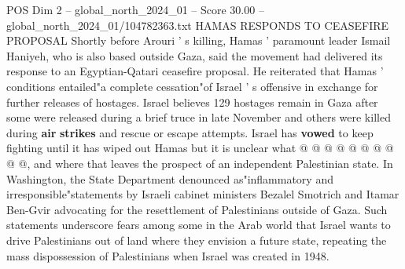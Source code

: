 \begin{textsample}{POS Dim 2 – global\_north\_2024\_01 – Score 30.00 – global\_north\_2024\_01/104782363.txt}
HAMAS RESPONDS TO CEASEFIRE PROPOSAL Shortly before Arouri ' s killing, Hamas ' paramount leader Ismail Haniyeh, who is also based outside Gaza, said the movement had delivered its response to an Egyptian-Qatari ceasefire proposal.
He reiterated that Hamas ' conditions entailed"a complete cessation"of Israel ' s offensive in exchange for further releases of hostages.
Israel believes 129 hostages remain in Gaza after some were released during a brief truce in late November and others were killed during \textbf{air} \textbf{strikes} and rescue or escape attempts.
Israel has \textbf{vowed} to keep fighting until it has wiped out Hamas but it is unclear what @ @ @ @ @ @ @ @ @ @, and where that leaves the prospect of an independent Palestinian state.
In Washington, the State Department denounced as"inflammatory and irresponsible"statements by Israeli cabinet ministers Bezalel Smotrich and Itamar Ben-Gvir advocating for the resettlement of Palestinians outside of Gaza.
Such statements underscore fears among some in the Arab world that Israel wants to drive Palestinians out of land where they envision a future state, repeating the mass dispossession of Palestinians when Israel was created in 1948.

\end{textsample}
